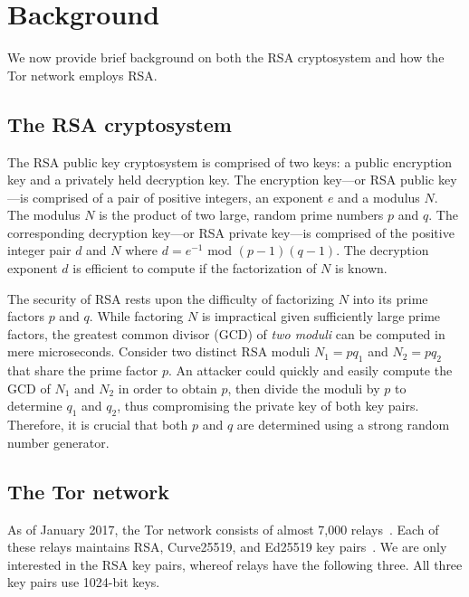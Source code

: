 \section{Background}
We now provide brief background on both the RSA cryptosystem and how the Tor
network employs RSA.

\subsection{The RSA cryptosystem}
The RSA public key cryptosystem is comprised of two keys: a public encryption
key and a privately held decryption key. The encryption key---or RSA public
key---is comprised of a pair of positive integers, an exponent $e$ and a modulus
$N$. The modulus $N$ is the product of two large, random prime numbers $p$ and
$q$. The corresponding decryption key---or RSA private key---is comprised of the
positive integer pair $d$ and $N$ where $d = e^{-1}$ mod $(p - 1)(q - 1)$.  The
decryption exponent $d$ is efficient to compute if the factorization of $N$ is
known.

The security of RSA rests upon the difficulty of factorizing $N$ into its prime
factors $p$ and $q$.  While factoring $N$ is impractical given sufficiently
large prime factors, the greatest common divisor (GCD) of \emph{two moduli} can
be computed in mere microseconds.  Consider two distinct RSA moduli $N_1 = pq_1$
and $N_2 = pq_2$ that share the prime factor $p$.  An attacker could quickly and
easily compute the GCD of $N_1$ and $N_2$ in order to obtain $p$, then divide
the moduli by $p$ to determine $q_1$ and $q_2$, thus compromising the private
key of both key pairs.  Therefore, it is crucial that both $p$ and $q$ are
determined using a strong random number generator.

\subsection{The Tor network}
As of January 2017, the Tor network consists of almost 7,000
relays~\cite{tormetrics}.  Each of these relays maintains RSA, Curve25519, and
Ed25519 key pairs~\cite[\S~1.1]{torspec}.  We are only interested in the
RSA key pairs, whereof relays have the following three.  All three key pairs use
1024-bit keys.

